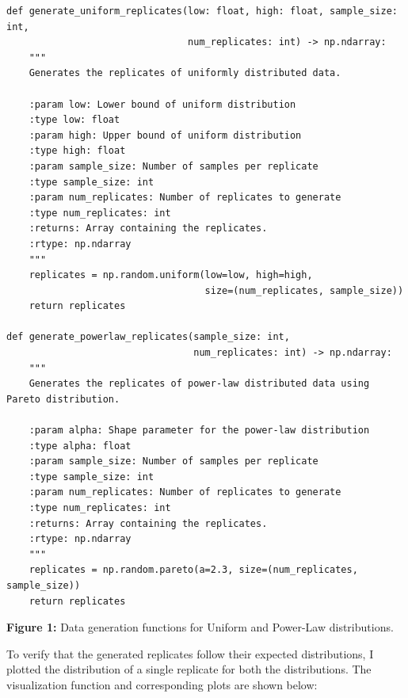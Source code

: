 \begin{verbatim}
def generate_uniform_replicates(low: float, high: float, sample_size: int, 
                                num_replicates: int) -> np.ndarray:
    """
    Generates the replicates of uniformly distributed data.
    
    :param low: Lower bound of uniform distribution
    :type low: float
    :param high: Upper bound of uniform distribution
    :type high: float
    :param sample_size: Number of samples per replicate
    :type sample_size: int
    :param num_replicates: Number of replicates to generate
    :type num_replicates: int
    :returns: Array containing the replicates.
    :rtype: np.ndarray
    """
    replicates = np.random.uniform(low=low, high=high, 
                                   size=(num_replicates, sample_size))
    return replicates

def generate_powerlaw_replicates(sample_size: int, 
                                 num_replicates: int) -> np.ndarray:
    """
    Generates the replicates of power-law distributed data using Pareto distribution.
    
    :param alpha: Shape parameter for the power-law distribution
    :type alpha: float
    :param sample_size: Number of samples per replicate
    :type sample_size: int
    :param num_replicates: Number of replicates to generate
    :type num_replicates: int
    :returns: Array containing the replicates.
    :rtype: np.ndarray
    """
    replicates = np.random.pareto(a=2.3, size=(num_replicates, sample_size))
    return replicates
\end{verbatim}

\begin{center}
\textbf{Figure 1:} Data generation functions for Uniform and Power-Law distributions.\\
\end{center}

To verify that the generated replicates follow their expected distributions, I plotted the distribution of a single replicate for both the distributions. The visualization function and corresponding plots are shown below:\\

